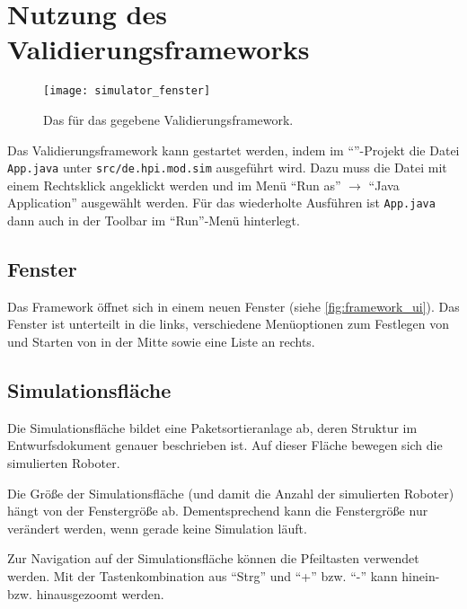 
\section{Nutzung des Validierungsframeworks}
\label{sec:framework}

\enlargethispage{1\baselineskip}

\begin{figure}[t]
	\centering
	\texttt{[image: simulator\_fenster]}
	\caption{Das für das \docProjectTitle{} gegebene Validierungsframework.}
	\label{fig:framework_ui}
\end{figure}


Das Validierungsframework kann gestartet werden, indem im \enquote{}-Projekt die Datei \texttt{App.java} unter \texttt{src/de.hpi.mod.sim} ausgeführt wird. 
Dazu muss die Datei mit einem Rechtsklick angeklickt werden und im Menü \enquote{Run as} $\rightarrow$ \enquote{Java Application} ausgewählt werden. 
Für das wiederholte Ausführen ist \texttt{App.java} dann auch in der Toolbar im \enquote{Run}-Menü hinterlegt.
 
\subsection{Fenster}

Das Framework öffnet sich in einem neuen Fenster (siehe \autoref{fig:framework_ui}).
Das Fenster ist unterteilt in die  links, verschiedene Menüoptionen zum Festlegen von  und Starten von  in der Mitte sowie eine Liste an  rechts.  


\subsection{Simulationsfläche}
\label{subsec:simulation}

Die Simulationsfläche bildet eine Paketsortieranlage ab, deren Struktur im Entwurfsdokument genauer beschrieben ist. 
Auf dieser Fläche bewegen sich die simulierten Roboter.

Die Größe der Simulationsfläche (und damit die Anzahl der simulierten Roboter) hängt von der Fenstergröße ab. 
Dementsprechend kann die Fenstergröße nur verändert werden, wenn gerade keine Simulation läuft.

Zur Navigation auf der Simulationsfläche können die Pfeiltasten verwendet werden.
Mit der Tastenkombination aus \enquote{Strg} und \enquote{+} bzw. \enquote{-} kann hinein- bzw. hinausgezoomt werden.



